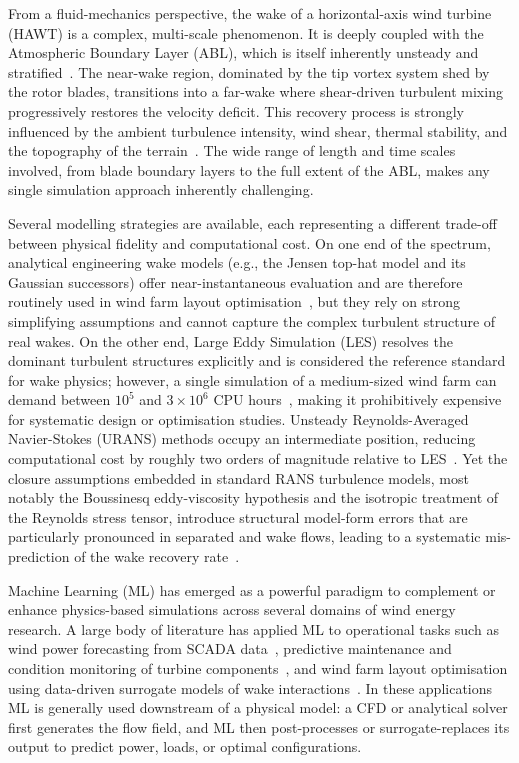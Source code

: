 From a fluid-mechanics perspective, the wake of a horizontal-axis wind turbine (HAWT) is a complex, multi-scale phenomenon. It is deeply coupled with the Atmospheric Boundary Layer (ABL), which is itself inherently unsteady and stratified~\cite{Porte-Agel2020}. The near-wake region, dominated by the tip vortex system shed by the rotor blades, transitions into a far-wake where shear-driven turbulent mixing progressively restores the velocity deficit. This recovery process is strongly influenced by the ambient turbulence intensity, wind shear, thermal stability, and the topography of the terrain~\cite{heck2025unravelingeffectsatmosphericdynamics}. The wide range of length and time scales involved, from blade boundary layers to the full extent of the ABL, makes any single simulation approach inherently challenging.

Several modelling strategies are available, each representing a different trade-off between physical fidelity and computational cost. On one end of the spectrum, analytical engineering wake models (e.g., the Jensen top-hat model and its Gaussian successors) offer near-instantaneous evaluation and are therefore routinely used in wind farm layout optimisation~\cite{GholamiAnjiraki2025}, but they rely on strong simplifying assumptions and cannot capture the complex turbulent structure of real wakes. On the other end, Large Eddy Simulation (LES) resolves the dominant turbulent structures explicitly and is considered the reference standard for wake physics; however, a single simulation of a medium-sized wind farm can demand between $10^5$ and $3 \times 10^6$ CPU hours~\cite{Steiner2021}, making it prohibitively expensive for systematic design or optimisation studies. Unsteady Reynolds-Averaged Navier-Stokes (URANS) methods occupy an intermediate position, reducing computational cost by roughly two orders of magnitude relative to LES~\cite{Steiner2021}. Yet the closure assumptions embedded in standard RANS turbulence models, most notably the Boussinesq eddy-viscosity hypothesis and the isotropic treatment of the Reynolds stress tensor, introduce structural model-form errors that are particularly pronounced in separated and wake flows, leading to a systematic mis-prediction of the wake recovery rate~\cite{72116acdc5aa4b3b8fc752f1b2fa9958,Moss2023}.

Machine Learning (ML) has emerged as a powerful paradigm to complement or enhance physics-based simulations across several domains of wind energy research. A large body of literature has applied ML to operational tasks such as wind power forecasting from SCADA data~\cite{Infield2022,Moss2023}, predictive maintenance and condition monitoring of turbine components~\cite{Infield2022}, and wind farm layout optimisation using data-driven surrogate models of wake interactions~\cite{GholamiAnjiraki2025,YANG2023119240}. In these applications ML is generally used downstream of a physical model: a CFD or analytical solver first generates the flow field, and ML then post-processes or surrogate-replaces its output to predict power, loads, or optimal configurations. 

